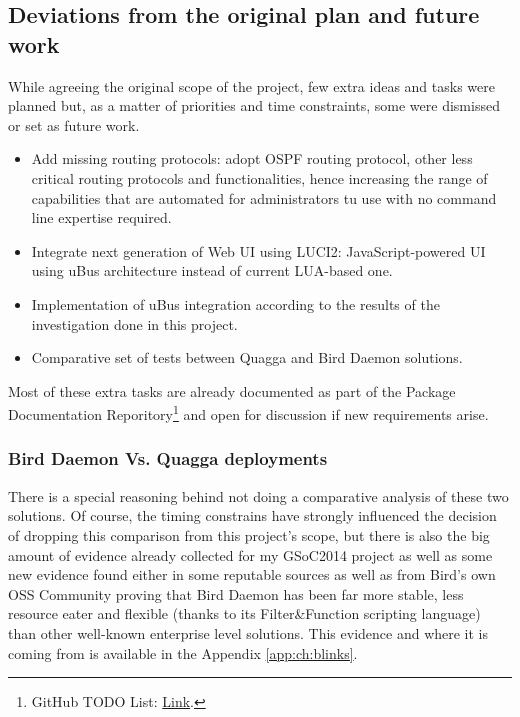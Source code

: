 \subsection{Deviations from the original plan and future work}
While agreeing the original scope of the project, few extra ideas and tasks were planned but, as a matter of priorities and time constraints, some were dismissed or set as future work.

\begin{itemize}
    \item Add missing routing protocols: adopt OSPF routing protocol, other less critical routing protocols and functionalities, hence increasing the range of capabilities that are automated for administrators tu use  with no command line expertise required.
    \item Integrate next generation of Web UI using LUCI2: JavaScript-powered UI using uBus architecture instead of current LUA-based one.
    \item Implementation of uBus integration according to the results of the investigation done in this project.
    \item Comparative set of tests between Quagga and Bird Daemon solutions.
\end{itemize}

Most of these extra tasks are already documented as part of the Package Documentation Reporitory\footnote{GitHub TODO List: \href{https://github.com/eloicaso/bgp-bmx6-bird-docn/blob/master/EN/TODO.md}{Link}.} and open for discussion if new requirements arise.

\subsubsection{Bird Daemon Vs. Quagga deployments}
There is a special reasoning behind not doing a comparative analysis of these two solutions. Of course, the timing constrains have strongly influenced the decision of dropping this comparison from this project's scope, but there is also the big amount of evidence already collected for my GSoC2014 project as well as some new evidence found either in some reputable sources as well as from Bird's own OSS Community proving that Bird Daemon has been far more stable, less resource eater and flexible (thanks to its Filter\&Function scripting language) than other well-known enterprise level solutions. This evidence and where it is coming from is available in the Appendix \ref{app:ch:blinks}.


